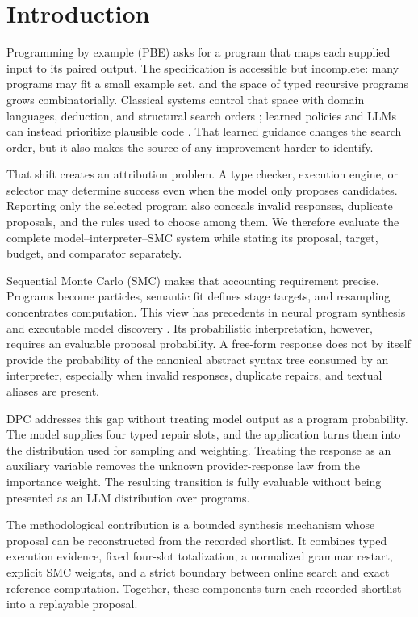 \documentclass[twoside,11pt]{article}
\newcommand{\method}{\textsc{DPC}\xspace}
\begin{document}
\section{Introduction}
\label{sec:introduction}

Programming by example (PBE) asks for a program that maps each supplied input
to its paired output. The specification is accessible but incomplete: many
programs may fit a small example set, and the space of typed recursive programs
grows combinatorially. Classical systems control that space with domain
languages, deduction, and structural search orders
\citep{gulwani2011flashfill,feser2015datastructure}; learned policies and LLMs
can instead prioritize plausible code
\citep{kalyan2018ngds,barke2024hysynth,li2024enumerative}. That learned guidance
changes the search order, but it also makes the source of any improvement harder
to identify.

That shift creates an attribution problem. A type checker, execution engine, or
selector may determine success even when the model only proposes candidates.
Reporting only the selected program also conceals invalid responses, duplicate
proposals, and the rules used to choose among them. We therefore evaluate the
complete model--interpreter--SMC system while stating its proposal, target,
budget, and comparator separately.

Sequential Monte Carlo (SMC) makes that accounting requirement precise.
Programs become particles, semantic fit defines stage targets, and resampling
concentrates computation. This view has precedents in neural program synthesis
\citep{ellis2019repl} and executable model discovery
\citep{wahl2026modelsmc}. Its probabilistic interpretation, however, requires
an evaluable proposal probability. A free-form response does not by itself
provide the probability of the canonical abstract syntax tree consumed by an
interpreter, especially when invalid responses, duplicate repairs, and textual
aliases are present.

\method addresses this gap without treating model output as a program
probability. The model supplies four typed repair slots, and the application
turns them into the distribution used for sampling and weighting. Treating the
response as an auxiliary variable removes the unknown provider-response law
from the importance weight. The resulting transition is fully evaluable without
being presented as an LLM distribution over programs.

The methodological contribution is a bounded synthesis mechanism whose
proposal can be reconstructed from the recorded shortlist. It combines typed
execution evidence, fixed four-slot totalization, a normalized grammar restart,
explicit SMC weights, and a strict boundary between online search and exact
reference computation. Together, these components turn each recorded shortlist
into a replayable proposal.
\end{document}
